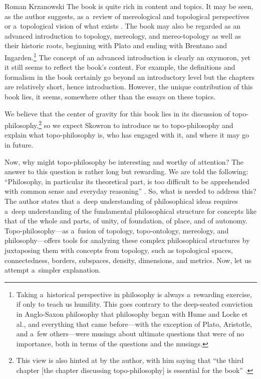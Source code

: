 \begin{newrevengenv}{Roman Krzanowski}
The book is quite rich in content and topics. It may be seen, as the author suggests, as a~review of mereological and topological perspectives 
\parencite[][p.xi]{skowron_czesc_2021} %
 or a~topological vision of what exists 
\parencite[][p.xi]{skowron_czesc_2021}. %
 The book may also be regarded as an advanced introduction to topology, mereology, and mereo-topology as well as their historic roots, beginning with Plato and ending with Brentano and Ingarden.\footnote{Taking a~historical perspective in philosophy is always a~rewarding exercise, if only to teach us humility. This goes contrary to the deep-seated conviction in Anglo-Saxon philosophy that philosophy began with Hume and Locke et al., and everything that came before---with the exception of Plato, Aristotle, and a~few others---were musings about ultimate questions that were of no importance, both in terms of the questions and the musings.} The concept of an advanced introduction is clearly an oxymoron, yet it still seems to reflect the book's content. For example, the definitions and formalism in the book certainly go beyond an introductory level but the chapters are relatively short, hence introduction. However, the unique contribution of this book lies, it seems, somewhere other than the essays on these topics.



We believe that the center of gravity for this book lies in its discussion of topo-philosophy,\footnote{This view is also hinted at by the author, with him saying that ``the third chapter [the chapter discussing topo-philosophy] is essential for the book'' 
\parencite[][p.xix]{skowron_czesc_2021}.%
} so we expect Skowron to introduce us to topo-philosophy and explain what topo-philosophy is, who has engaged with it, and where it may go in future.



Now, why might topo-philosophy be interesting and worthy of attention? The answer to this question is rather long but rewarding. We are told the following: ``Philosophy, in particular its theoretical part, is too difficult to be apprehended with common sense and everyday reasoning'' 
\parencite[][p.xvi]{skowron_czesc_2021}. %
 So, what is needed to address this? The author states that a~deep understanding of philosophical ideas requires a~deep understanding of the fundamental philosophical structure for concepts like that of the whole and parts, of unity, of foundation, of place, and of autonomy. Topo-philosophy---as a~fusion of topology, topo-ontology, mereology, and philosophy---offers tools for analyzing these complex philosophical structures by juxtaposing them with concepts from topology, such as topological spaces, connectedness, borders, subspaces, density, dimensions, and metrics. Now, let us attempt a~simpler explanation.




\end{newrevengenv}
